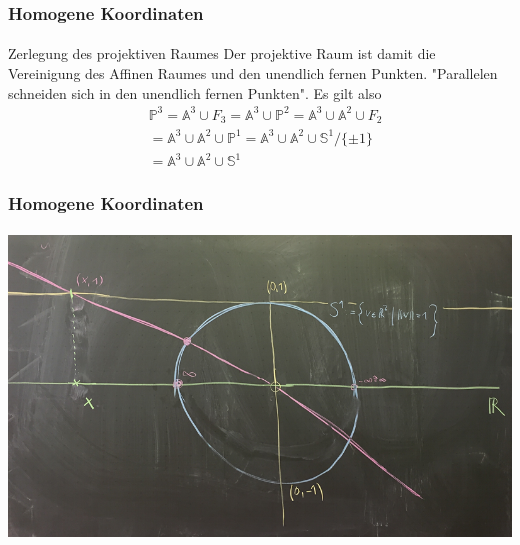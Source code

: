 \documentclass{beamer}
\begin{document}
\begin{frame}
    \frametitle{Homogene Koordinaten}
\framesubtitle{}
\begin{block}{Zerlegung des projektiven Raumes}
Der projektive Raum ist damit die Vereinigung des Affinen Raumes und den unendlich fernen Punkten. "Parallelen schneiden sich in den unendlich fernen Punkten".
Es gilt also 
\begin{align*}
& \mathbb{P}^3 = \mathbb{A}^3 \cup F_3 = \mathbb{A}^3  \cup \mathbb{P}^2 =  \mathbb{A}^3  \cup \mathbb{A}^2 \cup F_2  \\  
& =\mathbb{A}^3  \cup \mathbb{A}^2 \cup  \mathbb{P}^1 =   \mathbb{A}^3  \cup \mathbb{A}^2 \cup  \mathbb{S}^1/ \{ \pm  1\} \\
& =  \mathbb{A}^3  \cup \mathbb{A}^2 \cup  \mathbb{S}^1
\end{align*}
\end{block}
\end{frame}




\begin{frame}
    \frametitle{Homogene Koordinaten}
\framesubtitle{}

\begin{center}
\includegraphics[scale=0.40]{images/proj2.png}
\end{center}
\end{frame}
\end{document}
